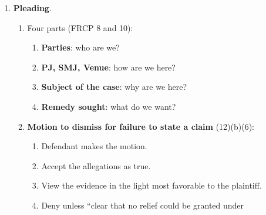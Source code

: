 \begin{enumerate}
\begin{enumerate}
\begin{enumerate}
\begin{enumerate}
\begin{itemize}
                    (\emph{Guaranty})?
                    \item Does the rule implicate both of the \textbf{twin 
                    aims of \emph{Erie}}?
                    \begin{itemize}
                        \item Discourage \textbf{forum shopping}.
                        \item Avoid \textbf{inequitable administration of the 
                        law}. Can you explain to your client why being in 
                        federal vs. state court makes a difference?
                    \end{itemize}
                    \item $\rightarrow$ If yes, apply the judge-made rule.  
                    Otherwise.
                \end{itemize}
            \end{enumerate}
        \end{enumerate}
        \item Federal substantive common law still applies under rare 
        circumstances. \emph{Clearfield Trust} (stolen WPA paycheck).
    \end{enumerate}
    \item \textbf{Pleading}.
    \begin{enumerate}
        \item Four parts (FRCP 8 and 10):
        \begin{enumerate}
            \item \textbf{Parties}: who are we?
            \item \textbf{PJ, SMJ, Venue}: how are we here?
            \item \textbf{Subject of the case}: why are we here?
            \item \textbf{Remedy sought}: what do we want?
        \end{enumerate}    
        \item \textbf{Motion to dismiss for failure to state a claim} 
        (12)(b)(6):
        \begin{enumerate}
            \item Defendant makes the motion.
            \item Accept the allegations as true.
            \item View the evidence in the light most favorable to the 
            plaintiff.
            \item Deny unless ``clear that no relief could be granted under 

\end{enumerate}
\end{enumerate}
\end{enumerate}
